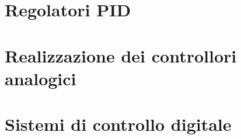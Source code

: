 \documentclass[../main.tex]{subfiles}
\begin{document}
\clearpage
\thispagestyle{empty}

\vspace*{7cm}
\section{Regolatori PID}
\vspace*{1.5cm}









\vspace*{7cm}
\section{Realizzazione dei controllori analogici}
\vspace*{1.5cm}







\vspace*{7cm}
\section{Sistemi di controllo digitale}
\vspace*{1.5cm}
\end{document}
